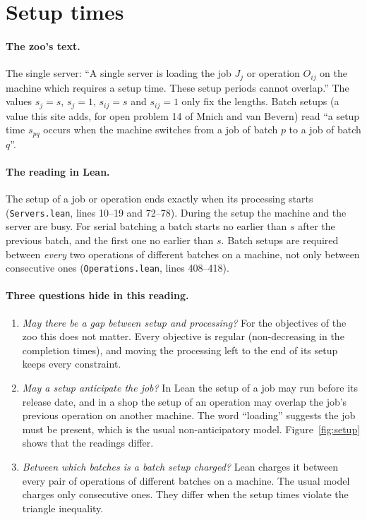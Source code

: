 \documentclass[11pt]{article}
\newcommand{\lean}[1]{\texttt{#1}}
\theoremstyle{definition}
\begin{document}
\section{Setup times}\label{sec:setups}

\paragraph{The zoo's text.} The single server: ``A single server is loading the
job $J_j$ or operation $O_{ij}$ on the machine which requires a setup time.
These setup periods cannot overlap.'' The values $s_j=s$, $s_j=1$, $s_{ij}=s$
and $s_{ij}=1$ only fix the lengths. Batch setups (a value this site adds,
for open problem 14 of Mnich and van Bevern) read ``a setup time $s_{pq}$
occurs when the machine switches from a job of batch $p$ to a job of batch
$q$''.

\paragraph{The reading in Lean.} The setup of a job or operation ends exactly
when its processing starts (\lean{Servers.lean}, lines 10--19 and 72--78). During
the setup the machine and the server are busy. For serial batching a batch
starts no earlier than $s$ after the previous batch, and the first one no
earlier than $s$. Batch setups are required between \emph{every} two operations
of different batches on a machine, not only between consecutive ones
(\lean{Operations.lean}, lines 408--418).

\paragraph{Three questions hide in this reading.}
\begin{enumerate}[leftmargin=*]
\item \emph{May there be a gap between setup and processing?} For the
objectives of the zoo this does not matter. Every objective is regular
(non-decreasing in the completion times), and moving the processing left to
the end of its setup keeps every constraint.
\item \emph{May a setup anticipate the job?} In Lean the setup of a job may
run before its release date, and in a shop the setup of an operation may
overlap the job's previous operation on another machine. The word
``loading'' suggests the job must be present, which is the usual
non-anticipatory model. Figure~\ref{fig:setup} shows that the readings differ.
\item \emph{Between which batches is a batch setup charged?} Lean charges
it between every pair of operations of different batches on a machine. The
usual model charges only consecutive ones. They differ when the setup times
violate the triangle inequality.
\end{enumerate}
\end{document}
